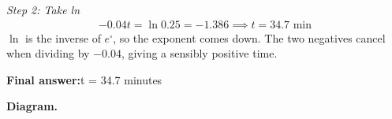 \documentclass[11pt]{article}
\begin{document}
\textit{Step 2: Take ln}
\[\begin{gathered}
-0.04t = \ln 0.25 = -1.386 \implies t = 34.7 \text{ min}
\end{gathered}\]
\( \ln \) is the inverse of \( e^{\square} \), so the exponent comes down. The two negatives cancel when dividing by \( -0.04 \), giving a sensibly positive time.

\begin{answerbox}
\textbf{Final answer:}\quad t = 34.7 minutes
\end{answerbox}
\textbf{Diagram.}

\begin{center}
\end{center}
\end{document}
